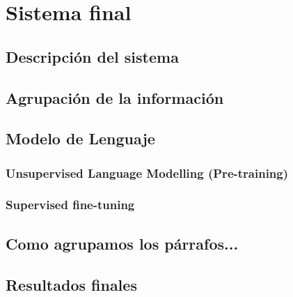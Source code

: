 \chapter{Sistema final}
\label{cap:sistemafinal}

\section{Descripción del sistema}

\section{Agrupación de la información}

\section{Modelo de Lenguaje}

\subsection{Unsupervised Language Modelling (Pre-training)}
\subsection{Supervised fine-tuning}

\section{Como agrupamos los párrafos... }


\section{Resultados finales}